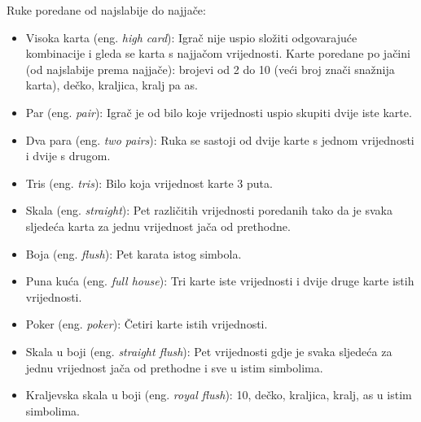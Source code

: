 Ruke poredane od najslabije do najjače:
\begin{itemize}
	\item Visoka karta (eng. \textit{high card}): Igrač nije uspio složiti odgovarajuće kombinacije i gleda se karta s najjačom vrijednosti. Karte poredane po jačini (od najslabije prema najjače):
	brojevi od 2 do 10 (veći broj znači snažnija karta), dečko, kraljica, kralj pa as.
	
	\item Par (eng. \textit{pair}): Igrač je od bilo koje vrijednosti uspio skupiti dvije iste karte.
	\item Dva para (eng. \textit{two pairs}): Ruka se sastoji od dvije karte s jednom vrijednosti i dvije s drugom.
	\item Tris (eng. \textit{tris}): Bilo koja vrijednost karte 3 puta.
	\item Skala (eng. \textit{straight}): Pet različitih vrijednosti poredanih tako da je svaka sljedeća karta za jednu vrijednost jača od prethodne.
	
	\item Boja (eng. \textit{flush}): Pet karata istog simbola.
	\item Puna kuća (eng. \textit{full house}): Tri karte iste vrijednosti i dvije druge karte istih vrijednosti.
	\item Poker (eng. \textit{poker}): Četiri karte istih vrijednosti.
	\item Skala u boji (eng. \textit{straight flush}): Pet vrijednosti gdje je svaka sljedeća za jednu vrijednost jača od prethodne i sve u istim simbolima.
	
	\item Kraljevska skala u boji (eng. \textit{royal flush}): 10, dečko, kraljica, kralj, as u istim simbolima.
\end{itemize}

